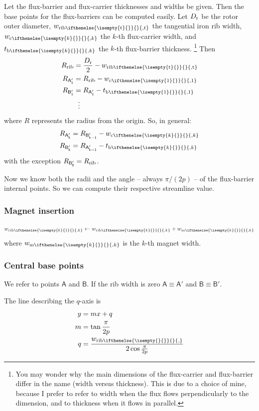\documentclass[b5paper,11pt,oneside,fleqn]{article}
\newcommand{\ped}[1]{_\textup{#1}}
\newcommand{\pt}[1]{\mathsf{#1}}
\newcommand{\wm}[1][]{%
w_{\textup{m}
\ifthenelse{\isempty{#1}{}}{}{,#1}%
}}
\newcommand{\wc}[1][]{%
w_{\textup{c}
\ifthenelse{\isempty{#1}{}}{}{,#1}%
}}
\newcommand{\tb}[1][]{%
t_{\textup{b}
\ifthenelse{\isempty{#1}{}}{}{,#1}%
}}
\newcommand{\wrib}[1][]{%
w_{\textup{rib}
\ifthenelse{\isempty{#1}{}}{}{,#1}%
}}
\newcommand{\wribt}{\wrib[\text{t}]}
\newcommand{\xth}[1]{$ #1 $-th}
\begin{document}
Let the flux-barrier and flux-carrier thicknesses and widths be given.
Then the base points for the flux-barriers can be computed easily.
Let
$ D\ped{r} $ be the rotor outer diameter,
$ \wribt $ the tangential iron rib width,
$ \wc[k] $ the \xth{k} flux-carrier width,
and $ \tb[k] $ the \xth{k} flux-barrier thickness.%
\footnote{%
You may wonder why the main dimensions of the flux-carrier and
flux-barrier differ in the name (width versus thickness).
This is due to a choice of mine,
because I prefer to refer to width when the flux flows perpendicularly to the
dimension,
and to thickness when it flows in parallel.%
}
%
Then
\begin{equation}
\begin{aligned}
R\ped{rib} &= \frac{D\ped{r}}{2} - \wribt \\
R_\pt{A_1'} &= R\ped{rib} - \wc[1] \\
R_\pt{B_1'} &= R_\pt{A_1'} - \tb[1] \\
    &\:\:\,\vdots
\end{aligned}
\end{equation}
where $ R $ represents the radius from the origin.
%
So, in general:
\begin{equation}
\begin{aligned}
R_\pt{A_k'} &= R_\pt{B_{k-1}'} - \wc[k] \\
R_\pt{B_k'} &= R_\pt{A_{k-1}'} - \tb[k]
\end{aligned}
\end{equation}
with the exception $ R_\pt{B_0'} = R\ped{rib} $.

Now we know both the radii and the angle -- always $ \pi/(2p) $ -- of the
flux-barrier internal points. So we can compute their respective streamline
value.



\subsubsection{Magnet insertion}
\[
\wrib[k] \leftarrow \wrib[k] + \wm[k]
\]
where $ \wm[k] $ is the \xth{k} magnet width.


\subsubsection{Central base points}
We refer to points $ \pt{A} $ and $ \pt{B} $.
If the rib width is zero
$ \pt{A} \equiv \pt{A}' $ and
$ \pt{B} \equiv \pt{B}' $.

The line describing the $ q $-axis is
\begin{equation}
\begin{aligned}
y &= m x + q \\
m &= \tan\frac{\pi}{2p} \\
q &= \frac{\wrib}{2 \cos\frac{\pi}{2p}}
\end{aligned}
\end{equation}
\end{document}
